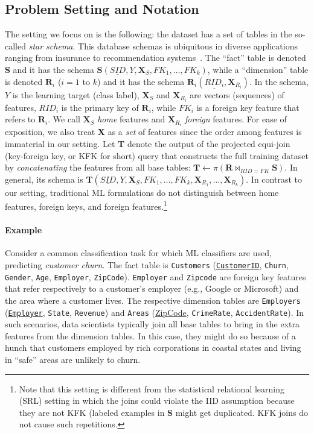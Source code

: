 \documentclass[sigconf]{acmart}
\begin{document}
\subsection{Problem Setting and Notation}
The setting we focus on is the following: the dataset has a set of tables in the so-called \textit{star schema}. 
This database schemas is ubiquitous in diverse applications ranging from insurance to recommendation systems~\cite{cowbook}.
The ``fact'' table is denoted \textbf{S} and it has the schema $\textbf{S}(\underline{SID},Y, \textbf{X}_S, FK_1, \dots, FK_k)$,
while a ``dimension'' table is denoted $\textbf{R}_i$ ($i = 1$ to $k$) and it has the schema $\textbf{R}_i(\underline{RID_i},\textbf{X}_{R_i})$.
In the schema, $Y$ is the learning target (class label), $\textbf{X}_S$ and $\textbf{X}_{R_i}$ are vectors (sequences) of features, $RID_i$ is the primary key
of $\textbf{R}_i$, while $FK_i$ is a foreign key feature that refers to $\textbf{R}_i$. We call $\textbf{X}_S$ \textit{home} features and $\textbf{X}_{R_i}$ \textit{foreign} features.
For ease of exposition, we also treat \textbf{X} as a \textit{set} of features since the order among features is immaterial in our setting.
Let \textbf{T} denote the output of the projected equi-join (key-foreign key, or KFK for short) query that constructs the full training dataset by 
\textit{concatenating} the features from all base tables: $\textbf{T} \leftarrow \pi(\textbf{R} \bowtie_{RID=FK} \textbf{S})$. In general, its schema is 
$\textbf{T}(\underline{SID},Y,\textbf{X}_S,FK_1,\dots,FK_k,\textbf{X}_{R_1},\dots,\textbf{X}_{R_k})$.
In contrast to our setting, traditional ML formulations do not distinguish between home features, foreign keys, and foreign features.\footnote{Note that this setting is 
different from the statistical relational learning (SRL) setting in which the joins could violate the IID assumption because they are not KFK (labeled examples in \textbf{S}
might get duplicated. KFK joins do not cause such repetitions.}

\paragraph*{Example}
Consider a common classification task for which ML classifiers are used, predicting \textit{customer churn}.
The fact table is \texttt{Customers} (\underline{\texttt{CustomerID}}, \texttt{Churn}, \texttt{Gender}, \texttt{Age}, \texttt{Employer}, \texttt{ZipCode}).
\texttt{Employer} and \texttt{Zipcode} are foreign key features that refer respectively to a customer's employer (e.g., Google or Microsoft) and the area 
where a customer lives. The respective dimension tables are \texttt{Employers} (\underline{\texttt{Employer}}, \texttt{State}, \texttt{Revenue}) 
and \texttt{Areas} (\underline{ZipCode}, \texttt{CrimeRate}, \texttt{AccidentRate}).
In such scenarios, data scientists typically join all base tables to bring in the extra features from the dimension tables. In this case, they might do so 
because of a hunch that customers employed by rich corporations in coastal states and living in ``safe'' areas are unlikely to churn.
\end{document}
